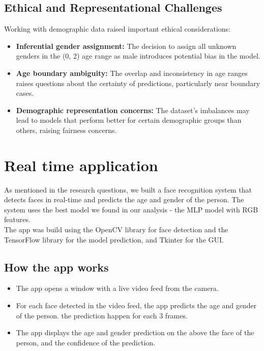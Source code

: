 \documentclass{article}
\begin{document}
\subsection{Ethical and Representational Challenges}
Working with demographic data raised important ethical considerations:

\begin{itemize}
    \item \textbf{Inferential gender assignment:} The decision to assign all unknown genders in the (0, 2) age range as male introduces potential bias in the model.

    \item \textbf{Age boundary ambiguity:} The overlap and inconsistency in age ranges raises questions about the certainty of predictions, particularly near boundary cases.

    \item \textbf{Demographic representation concerns:} The dataset's imbalances may lead to models that perform better for certain demographic groups than others, raising fairness concerns.
\end{itemize}

\newpage

\section{Real time application}
As mentioned in the research questions, we built a face recognition system that detects faces in real-time and predicts the age and gender of the person.
The system uses the best model we found in our analysis - the MLP model with RGB features.
\\
The app was build using the OpenCV library for face detection and the TensorFlow library for the model prediction, and Tkinter for the GUI.
\\
\subsection{How the app works}

\begin{itemize}
    \item The app opens a window with a live video feed from the camera.
    \item For each face detected in the video feed, the app predicts the age and gender of the person. the prediction happen for each 3 frames.
    \item The app displays the age and gender prediction on the above the face of the person, and the confidence of the prediction.
    
\end{itemize}
\end{document}
